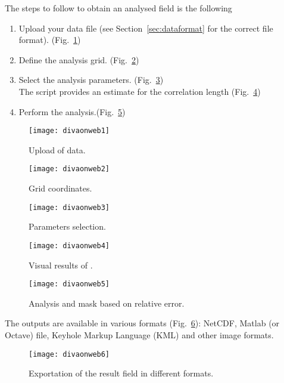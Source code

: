 The steps to follow to obtain an analysed field is the following

\begin{enumerate}
\item Upload your data file (see Section~\ref{sec:dataformat} for the correct file format). \hfill (Fig.~\ref{fig:divaonweb1})
\item Define the analysis grid. \hfill (Fig.~\ref{fig:divaonweb2})
\item Select the analysis parameters. \hfill (Fig.~\ref{fig:divaonweb3})\\
The script  provides an estimate for the correlation length \hfill (Fig.~\ref{fig:divaonweb4})
\item Perform the analysis.\hfill (Fig.~\ref{fig:divaonweb5})
\end{enumerate}

\begin{figure}[H]
\centering 
\texttt{[image: divaonweb1]}
\caption{Upload of data.\label{fig:divaonweb1}}
\end{figure}

\begin{figure}[H]
\centering 
\texttt{[image: divaonweb2]}
\caption{Grid coordinates.\label{fig:divaonweb2}}
\end{figure}

\begin{figure}[H]
\centering 
\texttt{[image: divaonweb3]}
\caption{Parameters selection.\label{fig:divaonweb3}}
\end{figure}

\begin{figure}[H]
\centering 
\texttt{[image: divaonweb4]}
\caption{Visual results of .\label{fig:divaonweb4}}
\end{figure}

\begin{figure}[H]
\centering 
\texttt{[image: divaonweb5]}
\caption{Analysis and mask based on relative error.\label{fig:divaonweb5}}
\end{figure}

The outputs are available in various formats (Fig.~\ref{fig:divaonweb6}): NetCDF, Matlab (or Octave) file, Keyhole Markup Language (KML) and other image formats. 

\begin{figure}[H]
\centering 
\texttt{[image: divaonweb6]}
\caption{Exportation of the result field in different formats.\label{fig:divaonweb6}}
\end{figure}


